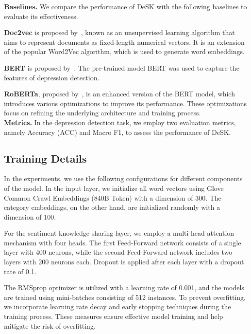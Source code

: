 \documentclass[runningheads]{llncs}
\begin{document}
\noindent\textbf{Baselines.} We compare the performance of DeSK with the following baselines to evaluate its effectiveness. 

\textbf{Doc2vec} is proposed by~\cite{mikolov2013distributed}, known as an unsupervised learning algorithm that aims to represent documents as fixed-length numerical vectors. It is an extension of the popular Word2Vec algorithm, which is used to generate word embeddings.

\textbf{BERT} is proposed by~\cite{devlin2018bert}. The pre-trained model BERT was used to capture the features of depression detection.  

\textbf{RoBERTa}, proposed by~\cite{liu2019roberta}, is an enhanced version of the BERT model, which introduces various optimizations to improve its performance. These optimizations focus on refining the underlying architecture and training process.\\


\noindent\textbf{Metrics.} In the depression detection task, we employ two evaluation metrics, namely Accuracy (ACC) and Macro F1, to assess the performance of DeSK.

\subsection{Training Details}
In the experiments, we use the following configurations for different components of the model. In the input layer, we initialize all word vectors using Glove Common Crawl Embeddings (840B Token) with a dimension of 300. The category embeddings, on the other hand, are initialized randomly with a dimension of 100.

For the sentiment knowledge sharing layer, we employ a multi-head attention mechanism with four heads. The first Feed-Forward network consists of a single layer with 400 neurons, while the second Feed-Forward network includes two layers with 200 neurons each. Dropout is applied after each layer with a dropout rate of 0.1.

The RMSprop optimizer is utilized with a learning rate of 0.001, and the models are trained using mini-batches consisting of 512 instances. To prevent overfitting, we incorporate learning rate decay and early stopping techniques during the training process. These measures ensure effective model training and help mitigate the risk of overfitting.
\end{document}

